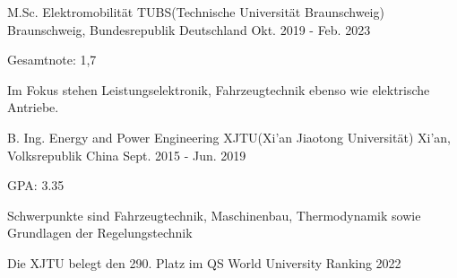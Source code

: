 

\begin{cventries}

  \cventry
  {M.Sc. Elektromobilität} %
  {TUBS(Technische Universität Braunschweig)} %
  {Braunschweig, Bundesrepublik Deutschland} %
  {Okt. 2019 - Feb. 2023} %
  {
    \begin{cvitems} %
      \item {Gesamtnote: 1,7}
      \item {Im Fokus stehen Leistungselektronik, Fahrzeugtechnik ebenso wie elektrische Antriebe.}
    \end{cvitems}
  }

  \cventry
  {B. Ing. Energy and Power Engineering}
  {XJTU(Xi'an Jiaotong Universität)}
  {Xi'an, Volksrepublik China}
  {Sept. 2015 - Jun. 2019}
  {
    \begin{cvitems}
      \item {GPA: 3.35}
      \item {Schwerpunkte sind Fahrzeugtechnik, Maschinenbau, Thermodynamik sowie Grundlagen der Regelungstechnik}
      \item {Die XJTU belegt den 290. Platz im QS World University Ranking 2022}
    \end{cvitems}
  }


\end{cventries}
